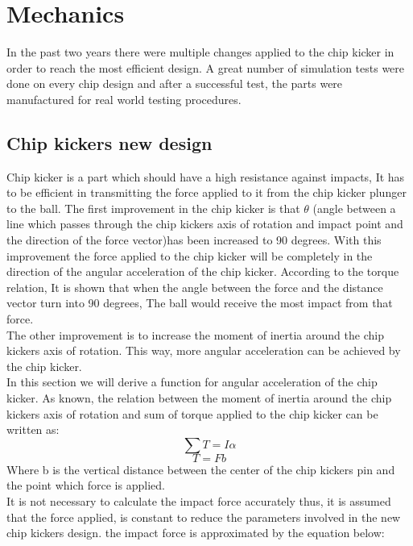\section{Mechanics}
\setlength\intextsep{0pt}
In the past two years there were multiple changes applied to the chip kicker in order to reach the most efficient design. A great number of simulation tests were done on every chip design and after a successful test, the parts were manufactured for real world testing procedures.

\subsection{Chip kickers new design}
Chip kicker is a part which should have a high resistance against impacts, It has to be efficient in transmitting the force applied to it from the chip kicker plunger to the ball. The first improvement in the chip kicker is that $\theta$ (angle between a line which passes through the chip kickers axis of rotation and impact point and the direction of the force vector)has been increased to 90 degrees. With this improvement the force applied to the chip kicker will be completely in the direction of the angular acceleration of the chip kicker. According to the torque relation, It is shown that when the angle between the force and the distance vector turn into 90 degrees, The ball would receive the most impact from that force.\\
\indent The other improvement is to increase the moment of inertia around the chip kickers axis of rotation. This way, more angular acceleration can be achieved by the chip kicker.\\
\indent In this section we will derive a function for angular acceleration of the chip kicker. As known, the relation between the moment of inertia around the chip kickers axis of rotation and sum of torque applied to the chip kicker can be written as:
\begin{equation}
\sum T=I\alpha
\end{equation}
\begin{equation}
T=Fb
\end{equation}
Where b is the vertical distance between the center of the chip kickers pin and the point which force is applied.\\
It is not necessary to calculate the impact force accurately thus, it is assumed that the force applied, is constant to reduce the parameters involved in the new chip kickers design. the impact force is approximated by the equation below:
